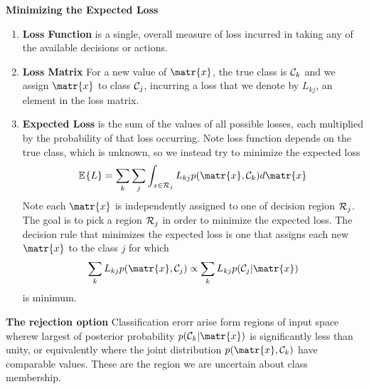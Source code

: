 \documentclass[11pt]{article}
\begin{document}
\begin{defn*}
    \textbf{Minimizing the Expected Loss} 
    \begin{enumerate}
        \item \textbf{Loss Function} is a single, overall measure of loss incurred in taking any of the available decisions or actions. 
        \item \textbf{Loss Matrix} For a new value of $\matr{x}$, the true class is $\mathcal{C}_k$ and we assign $\matr{x}$ to class $\mathcal{C}_j$, incurring a loss that we denote by $L_{kj}$, an element in the loss matrix. 
        \item \textbf{Expected Loss} is the sum of the values of all possible losses, each multiplied by the probability of that loss occurring. Note loss function depends on the true class, which is unknown, so we instead try to minimize the expected loss
        \[
            \E{L} = \sum_k \sum_j \int_{x\in \calR_j} L_{kj} p(\matr{x}, \calC_k) d\matr{x}
        \]
        Note each $\matr{x}$ is independently assigned to one of decision region $\mathcal{R}_j$. The goal is to pick a region $\mathcal{R}_j$ in order to minimize the expected loss. The decision rule that minimizes the expected loss is one that assigns each new $\matr{x}$ to the class $j$ for which 
        \[
            \sum_k L_{kj} p(\matr{x}, \calC_j) \propto \sum_k L_{kj} p(\calC_j | \matr{x})    
        \]
        is minimum. 
    \end{enumerate}
\end{defn*}

\begin{defn*}
    \textbf{The rejection option} Classification erorr arise form regions of input space wherew largest of posterior probability $p(\calC_k|\matr{x})$ is significantly less than unity, or equivalently where the joint distribution $p(\matr{x},\calC_k)$ have comparable values. These are the region we are uncertain about class membership. 
\end{defn*}
\end{document}
